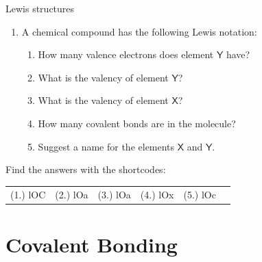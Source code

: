 \begin{exercises}{Lewis structures}
\begin{enumerate}[noitemsep, label=\textbf{\arabic*}. ]
                \label{m38701*uid38}\item A chemical compound has the following Lewis notation:
    \setcounter{subfigure}{0}
	\begin{figure}[H] %
\begin{center}
\end{center}
 \end{figure}       \label{m38701*id141181}\begin{enumerate}[noitemsep, label=\textbf{\alph*}. ] 
            \label{m38701*uid39}\item How many valence electrons does element $\mathsf{Y}$ have?
\label{m38701*uid40}\item What is the valency of element $\mathsf{Y}$?
\label{m38701*uid41}\item What is the valency of element $\mathsf{X}$?
\label{m38701*uid42}\item How many covalent bonds are in the molecule?
\label{m38701*uid43}\item Suggest a name for the elements $\mathsf{X}$ and $\mathsf{Y}$.
\end{enumerate}
                \end{enumerate}
  \label{m38701**end}
\par {} Find the answers with the shortcodes:
 \par \begin{tabular}[h]{cccccc}
 (1.) lOC  &  (2.) lOa  &  (3.) lOa  &  (4.) lOx  &  (5.) lOc  & \end{tabular}
\end{exercises}
    \label{m38704*cid5}
            \section{Covalent Bonding}
            \nopagebreak
            \label{m38704*uid6}
